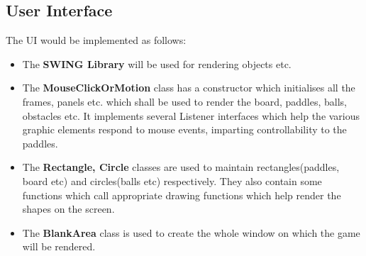 \documentclass{article}
\begin{document}
    \subsection{User Interface}
        The UI would be implemented as follows:
        \begin{itemize}
            \item The \textbf{SWING Library} will be used for rendering objects etc.
            \item The \textbf{MouseClickOrMotion} class has a constructor which initialises all the frames, panels etc. which shall be used to render the board, paddles, balls, obstacles etc. It implements several Listener interfaces which help the various graphic elements respond to mouse events, imparting controllability to the paddles.
            \item The \textbf{Rectangle, Circle} classes are used to maintain rectangles(paddles, board etc) and circles(balls etc) respectively. They also contain some functions which call appropriate drawing functions which help render the shapes on the screen.
            \item The \textbf{BlankArea} class is used to create the whole window on which the game will be rendered.
        \end{itemize}
\end{document}
